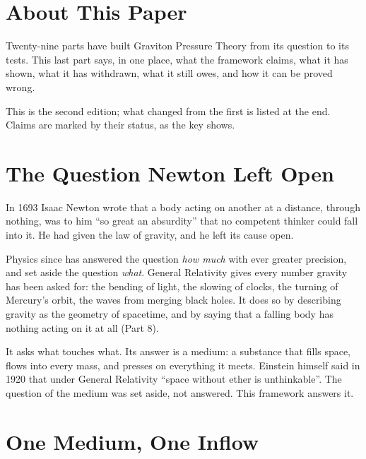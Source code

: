 \newcommand{\gptpart}{30}
\newcommand{\gpttitle}{Conclusion}
\newcommand{\gptsubtitle}{The Restoration of Reality}
\newcommand{\gptdate}{November 2026}

\graphicspath{{figs/}}

\gptitle

\section*{About This Paper}

Twenty-nine parts have built Graviton Pressure Theory from its question to its tests. This last part says, in one place, what the framework claims, what it has shown, what it has withdrawn, what it still owes, and how it can be proved wrong.

This is the second edition; what changed from the first is listed at the end. Claims are marked by their status, as the key shows.

\statuskey

\section{The Question Newton Left Open}

In 1693 Isaac Newton wrote that a body acting on another at a distance, through nothing, was to him ``so great an absurdity'' that no competent thinker could fall into it. He had given the law of gravity, and he left its cause open.

Physics since has answered the question \emph{how much} with ever greater precision, and set aside the question \emph{what}. General Relativity gives every number gravity has been asked for: the bending of light, the slowing of clocks, the turning of Mercury's orbit, the waves from merging black holes. It does so by describing gravity as the geometry of spacetime, and by saying that a falling body has nothing acting on it at all (Part 8).

 It asks what touches what. Its answer is a medium: a substance that fills space, flows into every mass, and presses on everything it meets. Einstein himself said in 1920 that under General Relativity ``space without ether is unthinkable''. The question of the medium was set aside, not answered. This framework answers it.

\section{One Medium, One Inflow}\label{sec:one}

